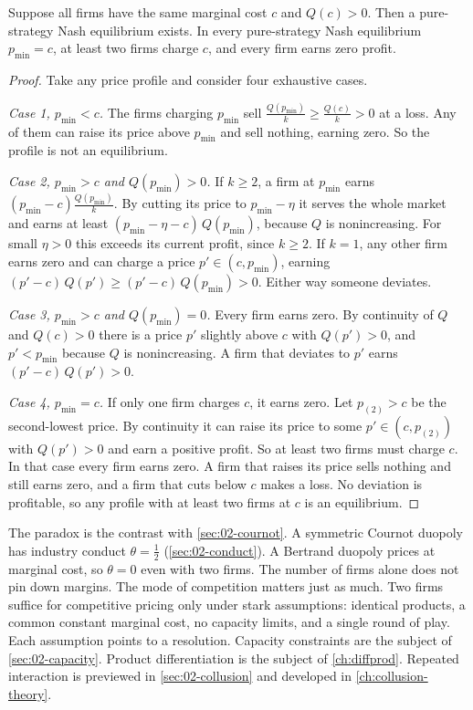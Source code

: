 \begin{proposition}\label{prop:02-bertrand}
Suppose all firms have the same marginal cost $c$ and $Q(c) > 0$. Then a pure-strategy Nash equilibrium exists. In
every pure-strategy Nash equilibrium $p_{\min} = c$, at least two firms charge $c$, and every firm earns zero profit.
\end{proposition}

\begin{proof}
Take any price profile and consider four exhaustive cases.

\emph{Case 1, $p_{\min} < c$.} The firms charging $p_{\min}$ sell $\frac{Q(p_{\min})}{k} \ge \frac{Q(c)}{k} > 0$ at a
loss. Any of them can raise its price above $p_{\min}$ and sell nothing, earning zero. So the profile is not an
equilibrium.

\emph{Case 2, $p_{\min} > c$ and $Q(p_{\min}) > 0$.} If $k \ge 2$, a firm at $p_{\min}$ earns
$(p_{\min} - c)\frac{Q(p_{\min})}{k}$. By cutting its price to $p_{\min} - \eta$ it serves the whole market and earns
at least $(p_{\min} - \eta - c)\, Q(p_{\min})$, because $Q$ is nonincreasing. For small $\eta > 0$ this exceeds its
current profit, since $k \ge 2$. If $k = 1$, any other firm earns zero and can charge a price $p' \in (c, p_{\min})$,
earning $(p' - c)\, Q(p') \ge (p' - c)\, Q(p_{\min}) > 0$. Either way someone deviates.

\emph{Case 3, $p_{\min} > c$ and $Q(p_{\min}) = 0$.} Every firm earns zero. By continuity of $Q$ and $Q(c) > 0$ there
is a price $p'$ slightly above $c$ with $Q(p') > 0$, and $p' < p_{\min}$ because $Q$ is nonincreasing. A firm that
deviates to $p'$ earns $(p' - c)\, Q(p') > 0$.

\emph{Case 4, $p_{\min} = c$.} If only one firm charges $c$, it earns zero. Let $p_{(2)} > c$ be the second-lowest
price. By continuity it can raise its price to some $p' \in (c, p_{(2)})$ with $Q(p') > 0$ and earn a positive
profit. So at least two firms must charge $c$. In that case every firm earns zero. A firm that raises its price sells
nothing and still earns zero, and a firm that cuts below $c$ makes a loss. No deviation is profitable, so any profile
with at least two firms at $c$ is an equilibrium.
\end{proof}

The paradox is the contrast with \cref{sec:02-cournot}. A symmetric Cournot duopoly has industry conduct
$\theta = \frac{1}{2}$ (\cref{sec:02-conduct}). A Bertrand duopoly prices at
marginal cost, so $\theta = 0$ even with two firms. The number of firms alone does not pin down margins. The mode of
competition matters just as much. Two firms suffice for competitive pricing only under stark assumptions: identical
products, a common constant marginal cost, no capacity limits, and a single round of play. Each assumption points to a
resolution. Capacity constraints are the subject of \cref{sec:02-capacity}. Product differentiation is the subject of
\cref{ch:diffprod}. Repeated interaction is previewed in \cref{sec:02-collusion} and developed in
\cref{ch:collusion-theory}.

